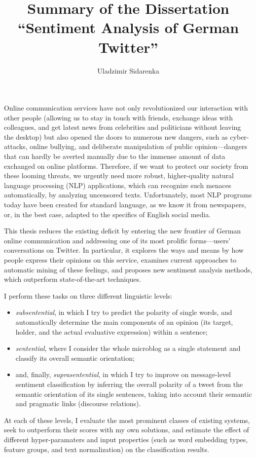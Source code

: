 \documentclass[11pt]{article}
\author{Uladzimir Sidarenka}
\title{  {\large Summary of the Dissertation}\\[0.5em]
  {\Large ``Sentiment Analysis of German Twitter''}}
\date{\vspace{-3ex}}
\begin{document}
\maketitle

Online communication services have not only revolutionized our
interaction with other people (allowing us to stay in touch with
friends, exchange ideas with colleagues, and get latest news from
celebrities and politicians without leaving the desktop) but also
opened the doors to numerous new dangers, such as cyber-attacks,
online bullying, and deliberate manipulation of public
opinion---dangers that can hardly be averted manually due to the
immense amount of data exchanged on online platforms.  Therefore, if
we want to protect our society from these looming threats, we urgently
need more robust, higher-quality natural language processing (NLP)
applications, which can recognize such menaces automatically, by
analyzing uncensored texts.  Unfortunately, most NLP programs today
have been created for standard language, as we know it from
newspapers, or, in the best case, adapted to the specifics of English
social media.

This thesis reduces the existing deficit by entering the new frontier
of German online communication and addressing one of its most prolific
forms---users' conversations on Twitter.  In particular, it explores
the ways and means by how people express their opinions on this
service, examines current approaches to automatic mining of these
feelings, and proposes new sentiment analysis methods, which
outperform state-of-the-art techniques.

I perform these tasks on three different linguistic levels:
\begin{itemize}
  \item\emph{subsentential}, in which I try to predict the polarity of
    single words, and automatically determine the main components of
    an opinion (its target, holder, and the actual evaluative
    expression) within a sentence;

  \item\emph{sentential}, where I consider the whole microblog as a
    single statement and classify its overall semantic orientation;

  \item and, finally, \emph{suprasentential}, in which I try to
    improve on message-level sentiment classification by inferring the
    overall polarity of a tweet from the semantic orientation of its
    single sentences, taking into account their semantic and pragmatic
    links (discourse relations).
\end{itemize}
At each of these levels, I evaluate the most prominent classes of
existing systems, seek to outperform their scores with my own
solutions, and estimate the effect of different hyper-paramaters and
input properties (such as word embedding types, feature groups, and
text normalization) on the classification results.
\end{document}
